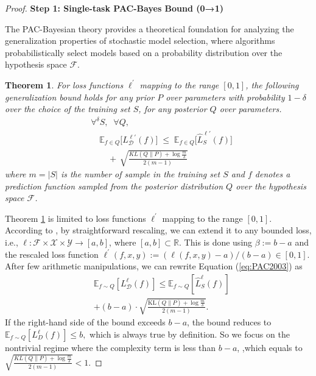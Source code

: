 \documentclass[letterpaper]{article} %
\newtheorem{theorem}{Theorem}
\begin{document}
\begin{proof}
\textbf{Step 1: Single-task PAC-Bayes Bound (0→1)}

The PAC-Bayesian theory provides a theoretical foundation for analyzing the generalization properties of stochastic model selection, where algorithms probabilistically select models based on a probability distribution over the hypothesis space \(\mathcal{F}\). 


\begin{theorem} \label{the: PAC1999}
\citep{mcallesterPACBayesianStochasticModel2003}
For loss functions $\ell^{'}$ mapping to the range $[0,1]$, the following generalization bound holds for any prior $P$ over parameters with probability $1 - \delta$ over the choice of the training set $S$, for any posterior $Q$ over parameters.
\begin{equation}\label{eq:PAC2003}
\begin{aligned}
    &\forall^{\delta} S,\;\; \forall Q, \\
    &\quad
    \mathbb{E}_{f \in Q}\big[L_{\mathcal{D}}^{\ell'}(f)\big] \;\leq\;
    \mathbb{E}_{f \in Q}\big[\hat{L}^{\ell'}_{S}(f)\big] \\
    &\qquad
    +\, \sqrt{
        \frac{
            KL(Q\|P) + \log\frac{m}{\delta}
        }{
            2(m-1)
        }
    }
\end{aligned}
\end{equation}
where $m=|S|$ is the number of sample in the training set $S$ and $f$ denotes a prediction function sampled from the posterior distribution $Q$ over the hypothesis space $\mathcal{F}$.
\end{theorem}

Theorem \ref{the: PAC1999} is limited to loss functions $\ell^{'}$ mapping to the range $[0,1]$. According to \citep{germainPACBayesianTheoryMeets2016}, by straightforward rescaling, we can extend it to any bounded loss, i.e., $\ell: \mathcal{F} \times \mathcal{X} \times \mathcal{Y} \rightarrow[a, b]$, where $[a, b] \subset \mathbb{R}$. This is done using $\beta:=b-a$ and the rescaled loss function $\ell^{\prime}(f, x, y):=(\ell(f, x, y)-a) /(b-a) \in[0,1]$. After few arithmetic manipulations, we can rewrite Equation (\ref{eq:PAC2003}) as
\begin{equation}
\begin{aligned}
        &\mathbb{E}_{f \sim Q}[{L}_\mathcal{D}^{\ell}(f)] \leq \mathbb{E}_{f\sim Q}[\widehat{{L}}_S^{\ell}(f)] \\
        &+ (b - a) \cdot \sqrt{\frac{\mathrm{KL}(Q \| P) + \log \frac{m}{\delta}}{2(m - 1)}} .
\end{aligned}
\end{equation}
If the right-hand side of the bound exceeds $b-a$, the bound reduces to
$\mathbb{E}_{f \sim Q}[L_D^{\ell}(f)] \leq b,$
which is always true by definition. So we focus on the nontrivial regime where the complexity term is less than $b-a$, ,which equals to
$\sqrt{\frac{KL(Q\|P)+\log \frac{m}{\delta}}{2(m-1)}} <1. $



\end{proof}
\end{document}
